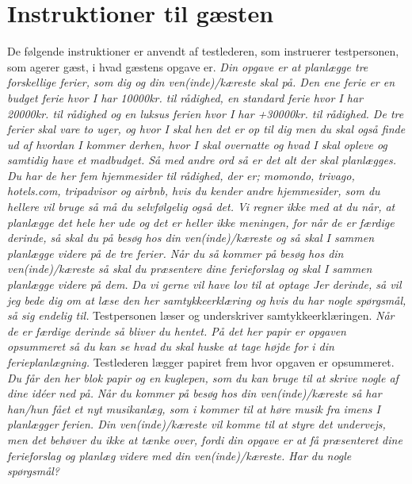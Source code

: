 \chapter{Instruktioner til gæsten}
\label{app:InstruktionerGaest}
%
De følgende instruktioner er anvendt af testlederen, som instruerer testpersonen, som agerer gæst, i hvad gæstens opgave er.\blankline
%
\textit{Din opgave er at planlægge tre forskellige ferier, som dig og din ven(inde)/kæreste skal på. Den ene ferie er en budget ferie hvor I har 10000kr. til rådighed, en standard ferie hvor I har 20000kr. til rådighed og en luksus ferien hvor I har +30000kr. til rådighed. De tre ferier skal vare to uger, og hvor I skal hen det er op til dig men du skal også finde ud af hvordan I kommer derhen, hvor I skal overnatte og hvad I skal opleve og samtidig have et madbudget. Så med andre ord så er det alt der skal planlægges. Du har de her fem hjemmesider til rådighed, der er; momondo, trivago, hotels.com, tripadvisor og airbnb, hvis du kender andre hjemmesider, som du hellere vil bruge så må du selvfølgelig også det. Vi regner ikke med at du når, at planlægge det hele her ude og det er heller ikke meningen, for når de er færdige derinde, så skal du på besøg hos din ven(inde)/kæreste og så skal I sammen planlægge videre på de tre ferier. Når du så kommer på besøg hos din ven(inde)/kæreste så skal du præsentere dine ferieforslag og skal I sammen planlægge videre på dem.}\blankline
%
\textit{Da vi gerne vil have lov til at optage Jer derinde, så vil jeg bede dig om at læse den her samtykkeerklæring og hvis du har nogle spørgsmål, så sig endelig til.}\blankline
%
Testpersonen læser og underskriver samtykkeerklæringen.\blankline
%
\textit{Når de er færdige derinde så bliver du hentet. På det her papir er opgaven opsummeret så du kan se hvad du skal huske at tage højde for i din ferieplanlægning.}\blankline
%
Testlederen lægger papiret frem hvor opgaven er opsummeret. \blankline
%
\textit{Du får den her blok papir og en kuglepen, som du kan bruge til at skrive nogle af dine idéer ned på.}\blankline
%
\textit{Når du kommer på besøg hos din ven(inde)/kæreste så har han/hun fået et nyt musikanlæg, som i kommer til at høre musik fra imens I planlægger ferien. Din ven(inde)/kæreste vil komme til at styre det undervejs, men det behøver du ikke at tænke over, fordi din opgave er at få præsenteret dine ferieforslag og planlæg videre med din ven(inde)/kæreste. Har du nogle spørgsmål?}



